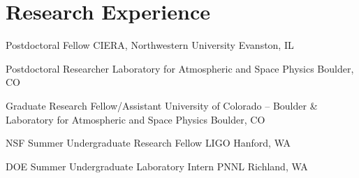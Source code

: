 \section{Research Experience}


		{Postdoctoral Fellow}
		{CIERA, Northwestern University}
		{Evanston, IL}
		{}
		{}


		{Postdoctoral Researcher}
		{Laboratory for Atmospheric and Space Physics}
		{Boulder, CO}
		{}
		{}


		{Graduate Research Fellow/Assistant}
		{University of Colorado -- Boulder \& Laboratory for Atmospheric and Space Physics}
		{Boulder, CO}
		{}
		{}

		{NSF Summer Undergraduate Research Fellow}
		{LIGO}
		{Hanford, WA}
		{}
		{}

		{DOE Summer Undergraduate Laboratory Intern}
		{PNNL}
		{Richland, WA}
		{}
		{}
